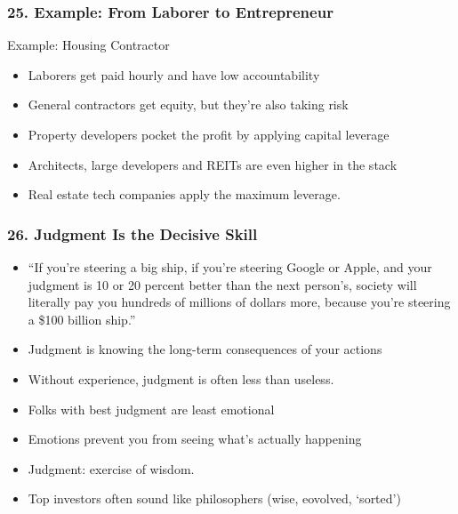 \begin{frame}[fragile]
\frametitle{25. Example: From Laborer to Entrepreneur}
Example: Housing Contractor
\begin{itemize}
\item Laborers get paid hourly and have low accountability
\item General contractors get equity, but they're also taking risk
\item Property developers pocket the profit by applying capital leverage
\item Architects, large developers and REITs are even higher in the stack
\item Real estate tech companies apply the maximum leverage.
\end{itemize}
\end{frame}

\begin{frame}[fragile]
\frametitle{26. Judgment Is the Decisive Skill}
\begin{itemize}
\item ``If you're steering a big ship, if you're steering Google or Apple, and your judgment is 10 or 20 percent better than the next person's, society will literally pay you hundreds of millions of dollars more, because you're steering a \$100 billion ship.''
\item Judgment is knowing the long-term consequences of your actions
\item Without experience, judgment is often less than useless.
\item Folks with best judgment are least emotional
\item Emotions prevent you from seeing what's actually happening
\item Judgment: exercise of wisdom. 
\item Top investors often sound like philosophers (wise, eovolved, `sorted')
\end{itemize}
\end{frame}

